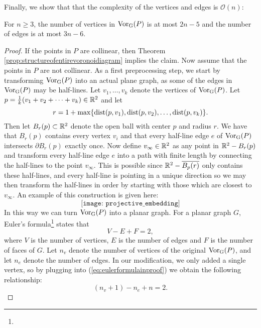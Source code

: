 Finally, we show that that the complexity of the vertices and edges is $\mathcal{O}(n)$:
\begin{thm} \label{thm:numberofvertsandedges}
For $n \geq 3$, the number of vertices in $\operatorname{Vor_{G}}(P)$ is at most $2n - 5$ and the number of edges is at most $3n - 6$.
\end{thm}
\begin{proof}
If the points in $P$ are collinear, then Theorem \ref{prop:structureofentirevoronoidiagram} implies the claim. Now assume that the points in $P$ are not collinear. As a first preprocessing step, we start by transforming $\operatorname{Vor_{G}}(P)$ into an actual plane graph, as some of the edges in $\operatorname{Vor_{G}}(P)$ may be half-lines. Let $v_1, \ldots, v_k$ denote the vertices of $\operatorname{Vor_{G}}(P)$. Let $p = \tfrac{1}{k}(v_1 + v_2 + \cdots + v_k) \in \mathbb{R}^2$ and let
\[
    r = 1 + \max\{\operatorname{dist}(p, v_1), \operatorname{dist}(p, v_2), \ldots, \operatorname{dist}(p, v_k)\}.
\]
Then let $B_r(p) \subset \mathbb{R}^2$ denote the open ball with center $p$ and radius $r$. We have that $B_r(p)$ contains every vertex $v_i$ and that every half-line edge $e$ of $\operatorname{Vor_{G}}(P)$ intersects $\partial B_r(p)$ exactly once. Now define $v_{\infty} \in \mathbb{R}^2$ as any point in $\mathbb{R}^2 - B_r(p)$ and transform every half-line edge $e$ into a path with finite length by connecting the half-lines to the point $v_{\infty}$. This is possible since $\mathbb{R}^2 - \overline{B_p(r)}$ only contains these half-lines, and every half-line is pointing in a unique direction so we may then transform the half-lines in order by starting with those which are closest to $v_{\infty}$. An example of this construction is given here:
\[
    \texttt{[image: projective\_embedding]} %
\]
In this way we can turn $\operatorname{Vor_{G}}(P)$ into a planar graph. For a planar graph $G$, Euler's formula\footnote{} states that
\begin{equation} \label{eq:eulerformulainproof}
    V - E + F = 2,
\end{equation}
where $V$ is the number of vertices, $E$ is the number of edges and $F$ is the number of faces of $G$. Let $n_v$ denote the number of vertices of the original $\operatorname{Vor_{G}}(P)$, and let $n_e$ denote the number of edges. In our modification, we only added a single vertex, so by plugging into (\ref{eq:eulerformulainproof}) we obtain the following relationship:
\begin{equation} \label{eq:eulersformulaapplied}
    (n_v + 1) - n_e + n = 2.
\end{equation}

\end{proof}
